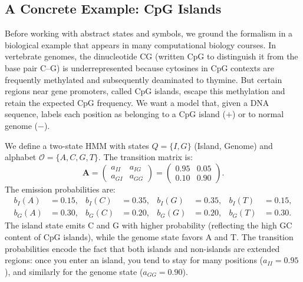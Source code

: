 \subsection{A Concrete Example: CpG Islands}
\label{sec:cpg-example}

Before working with abstract states and symbols, we ground the formalism in a biological example that appears in many computational biology courses.
In vertebrate genomes, the dinucleotide CG (written CpG to distinguish it from the base pair C--G) is underrepresented because cytosines in CpG contexts are frequently methylated and subsequently deaminated to thymine.
But certain regions near gene promoters, called CpG islands, escape this methylation and retain the expected CpG frequency.
We want a model that, given a DNA sequence, labels each position as belonging to a CpG island ($+$) or to normal genome ($-$).

We define a two-state HMM with states $Q = \{I, G\}$ (Island, Genome) and alphabet $\mathcal{O} = \{A, C, G, T\}$.
The transition matrix is:
\begin{equation}
\label{eq:cpg-transition}
  \bm{A} = \begin{pmatrix} a_{II} & a_{IG} \\ a_{GI} & a_{GG} \end{pmatrix} = \begin{pmatrix} 0.95 & 0.05 \\ 0.10 & 0.90 \end{pmatrix}.
\end{equation}
The emission probabilities are:
\begin{equation}
\label{eq:cpg-emission}
\begin{aligned}
  b_I(A) &= 0.15, & b_I(C) &= 0.35, & b_I(G) &= 0.35, & b_I(T) &= 0.15, \\
  b_G(A) &= 0.30, & b_G(C) &= 0.20, & b_G(G) &= 0.20, & b_G(T) &= 0.30.
\end{aligned}
\end{equation}
The island state emits C and G with higher probability (reflecting the high GC content of CpG islands), while the genome state favors A and T.
The transition probabilities encode the fact that both islands and non-islands are extended regions: once you enter an island, you tend to stay for many positions ($a_{II} = 0.95$), and similarly for the genome state ($a_{GG} = 0.90$).

